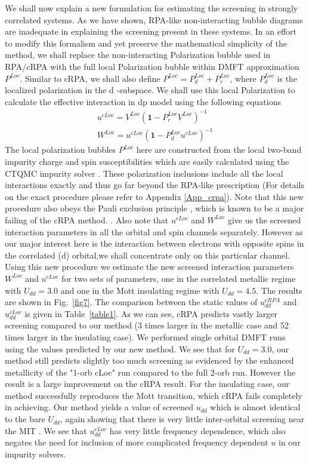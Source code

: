 \documentclass[10pt]{ruthesis}
\begin{document}
{We shall now explain a new formulation for estimating the screening in strongly correlated systems. As we have shown, RPA-like non-interacting bubble diagrams are inadequate in explaining the screening present in these systems. In an effort to modify this formalism and yet preserve the mathematical simplicity of the method, we shall replace the non-interacting Polarization bubble used in RPA/cRPA with the full local Polarization bubble within DMFT approximation $P^{Loc}$. Similar to cRPA, we shall also define $P^{Loc}=P_d^{Loc}+P_r^{Loc}$, where $P^{Loc}_d$ is the localized polarization in the d -subspace. We shall use this local Polarization to calculate the effective interaction in dp model using the following equations
\begin{align}\label{Uloc_def}
u^{cLoc}=V^{Loc}(\mathbf{1}- P_r^{Loc}V^{Loc})^{-1} \\
W^{Loc}=u^{cLoc}(\mathbf{1}-P_d^{Loc} u^{cLoc})^{-1}
\end{align} 
The local polarization bubbles $P^{Loc}$ here are constructed from the local two-band impurity charge and spin susceptibilities which are easily calculated using the CTQMC impurity solver \cite{Chakrabarti_Cerium}. These polarization inclusions include all the local interactions exactly and thus go far beyond the RPA-like prescription (For details on the exact procedure please refer to Appendix \ref{App_crpa}). Note that this new procedure also obeys the Pauli exclusion principle , which is known to be a major failing of the cRPA method. \cite{PRB_AccurayofcRPA_2014_P.Werner}. Also note that $u^{cLoc}$ and $W^{Loc}$ give us the screened interaction parameters in all the orbital and spin channels separately. However as  our major interest here is  the interaction between electrons with opposite spins in the correlated (d) orbital,we shall concentrate only on this particular channel. Using this new procedure we estimate the new screened interaction parameters $W^{Loc}$ and $u^{cLoc}$ for two sets of parameters, one in the correlated metallic regime with $U_{dd}=3.0$ and one in the Mott insulating regime with $U_{dd}=4.5$. The results are shown in Fig.~\ref{fig7}. The comparison between the static values of $u^{cRPA}_{dd}$ and $u^{cLoc}_{dd}$ is given in Table~\ref{table1}. As we can see, cRPA predicts vastly larger screening compared to our method (3 times larger in the metallic case and 52 times larger in the insulating case).
We performed single orbital DMFT runs using the values predicted by our new method. We see that for $U_{dd}=3.0$, our method still predicts slightly too much screening as evidenced by the enhanced metallicity of the "1-orb cLoc" run compared to the full 2-orb run. However the result is a large improvement on the cRPA result. For the insulating case, our method successfully reproduces the Mott transition, which cRPA fails completely in achieving. Our method yields a value of screened $u_{dd}$ which is almost identical to the bare $U_{dd}$, again showing that there is very little inter-orbital screening near the MIT . We see that $u^{cLoc}_{dd}$ has very little frequency dependence, which also negates the need for inclusion of more complicated frequency dependent $u$ in our impurity solvers.

}
\end{document}
